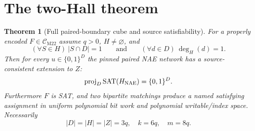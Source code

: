 \documentclass[11pt]{article}
\newtheorem{theorem}{Theorem}
\newcommand{\CM}{\mathcal C_{\mathrm{M22}}}
\newcommand{\SAT}{\operatorname{SAT}}
\begin{document}
\section{The two-Hall theorem}
\begin{theorem}[Full paired-boundary cube and source satisfiability]
For a properly encoded $F\in\CM$ assume $q>0$, $H\ne\varnothing$, and
\[
\tag{G}
(\forall S\in H)\ |S\cap D|=1
\qquad\text{and}\qquad
(\forall d\in D)\ \deg_H(d)=1.
\]
Then for every $u\in\{0,1\}^{D}$ the pinned paired NAE network has a source-consistent extension to $Z$:
\[
\operatorname{proj}_D\SAT(H_{\rm NAE})=\{0,1\}^D.
\]
Furthermore $F$ is SAT, and two bipartite matchings produce a named satisfying assignment in uniform polynomial bit work and polynomial writable/index space. Necessarily
\[
|D|=|H|=|Z|=3q,\quad k=6q,\quad m=8q.
\]
\end{theorem}
\end{document}
